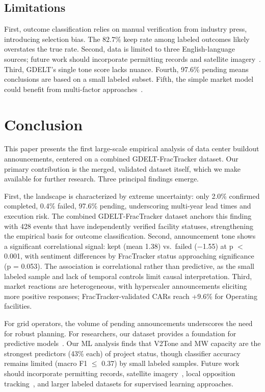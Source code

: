 \documentclass[5p,12pt]{elsarticle}
\begin{document}
\subsection*{Limitations}
First, outcome classification relies on manual verification from industry press, introducing selection bias. The 82.7\% keep rate among labeled outcomes likely overstates the true rate. Second, data is limited to three English-language sources; future work should incorporate permitting records and satellite imagery~\cite{SynMax2026Satellite}. Third, GDELT's single tone score lacks nuance. Fourth, 97.6\% pending means conclusions are based on a small labeled subset. Fifth, the simple market model could benefit from multi-factor approaches~\cite{GoldsmithPinkham2025Financial}.

\section{Conclusion}
\label{sec:conclusion}

This paper presents the first large-scale empirical analysis of data center buildout announcements, centered on a combined GDELT-FracTracker dataset. Our primary contribution is the merged, validated dataset itself, which we make available for further research. Three principal findings emerge.

First, the landscape is characterized by extreme uncertainty: only 2.0\% confirmed completed, 0.4\% failed, 97.6\% pending, underscoring multi-year lead times and execution risk. The combined GDELT-FracTracker dataset anchors this finding with 428 events that have independently verified facility statuses, strengthening the empirical basis for outcome classification. Second, announcement tone shows a significant correlational signal: kept (mean 1.38) vs.\ failed ($-$1.55) at p $<$ 0.001, with sentiment differences by FracTracker status approaching significance (p = 0.053). The association is correlational rather than predictive, as the small labeled sample and lack of temporal controls limit causal interpretation. Third, market reactions are heterogeneous, with hyperscaler announcements eliciting more positive responses; FracTracker-validated CARs reach +9.6\% for Operating facilities.

For grid operators, the volume of pending announcements underscores the need for robust planning. For researchers, our dataset provides a foundation for predictive models~\cite{Fitzsimmons2022Construction,Mosca2026AI,Johnston2023Empirical,Rand2025QueuedUp}. Our ML analysis finds that V2Tone and MW capacity are the strongest predictors (43\% each) of project status, though classifier accuracy remains limited (macro F1 $\leq$ 0.37) by small labeled samples. Future work should incorporate permitting records, satellite imagery~\cite{SynMax2026Satellite}, local opposition tracking~\cite{DataCenterWatch2025Q1}, and larger labeled datasets for supervised learning approaches.
\end{document}
